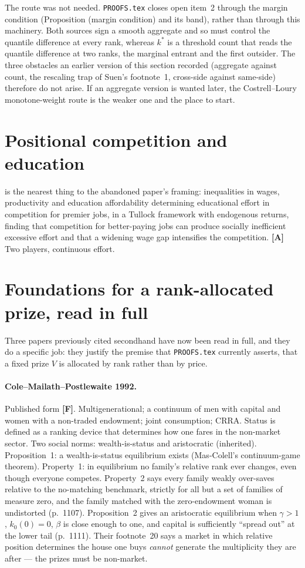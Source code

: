 \documentclass[11pt,a4paper]{article}
\begin{document}
The route was not needed. \texttt{PROOFS.tex} closes open item~2 through the
margin condition (Proposition (margin condition) and its band), rather than
through this machinery. Both sources sign a smooth aggregate and so must
control the quantile difference at every rank, whereas $k^*$ is a threshold
count that reads the quantile difference at two ranks, the marginal entrant and
the first outsider. The three
obstacles an earlier version of this section recorded (aggregate against count,
the rescaling trap of Suen's footnote~1, cross-side against same-side)
therefore do not arise. If an aggregate version is wanted later, the
Costrell--Loury monotone-weight route is the weaker one and the place to
start.

\section{Positional competition and education}

\citet{ChungLee2017} is the nearest thing to the abandoned paper's framing:
inequalities in wages, productivity and education affordability determining
educational effort in competition for premier jobs, in a Tullock framework with
endogenous returns, finding that competition for better-paying jobs can produce
socially inefficient excessive effort and that a widening wage gap intensifies
the competition. \textbf{[A]} Two players, continuous effort.

\section{Foundations for a rank-allocated prize, read in full}
\label{sec:foundations}

Three papers previously cited secondhand have now been read in full, and they
do a specific job: they justify the premise that \texttt{PROOFS.tex} currently
asserts, that a fixed prize $V$ is allocated by rank rather than by price.

\paragraph{Cole--Mailath--Postlewaite 1992.} Published form \textbf{[F]}.
Multigenerational; a continuum of men with capital and women with a
non-traded endowment; joint consumption; CRRA. Status is defined as a ranking
device that determines how one fares in the non-market sector. Two social
norms: wealth-is-status and aristocratic (inherited). Proposition~1: a
wealth-is-status equilibrium exists (Mas-Colell's continuum-game theorem).
Property~1: in equilibrium no family's relative rank ever changes, even though
everyone competes. Property~2 says every family weakly over-saves relative to
the no-matching benchmark, strictly for all but a set of families of measure
zero, and the family matched with the zero-endowment woman is undistorted
(p.~1107). Proposition~2 gives an aristocratic equilibrium when $\gamma > 1$,
$k_0(0) = 0$, $\beta$ is close enough to one, and capital is sufficiently
``spread out'' at the lower tail (p.~1111). Their footnote~20 says a market
in which relative position determines the house one buys \emph{cannot}
generate the multiplicity they are after --- the prizes must be non-market.
\end{document}
